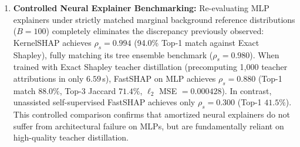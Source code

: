 \documentclass[conference]{IEEEtran}
\begin{document}
\begin{enumerate}
    \item \textbf{Controlled Neural Explainer Benchmarking:} Re-evaluating MLP explainers under strictly matched marginal background reference distributions ($B=100$) completely eliminates the discrepancy previously observed: KernelSHAP achieves $\rho_s = \mathbf{0.994}$ (94.0\% Top-1 match against Exact Shapley), fully matching its tree ensemble benchmark ($\rho_s = 0.980$). When trained with Exact Shapley teacher distillation (precomputing 1,000 teacher attributions in only $6.59$\,s), FastSHAP on MLP achieves $\rho_s = \mathbf{0.880}$ (Top-1 match $88.0\%$, Top-3 Jaccard $71.4\%$, $\ell_2$ MSE $= 0.000428$). In contrast, unassisted self-supervised FastSHAP achieves only $\rho_s = 0.300$ (Top-1 $41.5\%$). This controlled comparison confirms that amortized neural explainers do not suffer from architectural failure on MLPs, but are fundamentally reliant on high-quality teacher distillation.
\end{enumerate}
\end{document}
